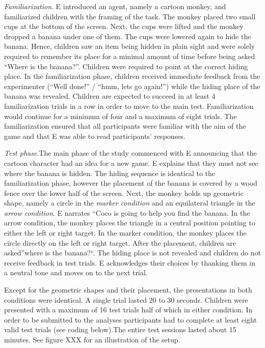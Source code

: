 \documentclass[
  man]{apa6}
\begin{document}
\emph{Familiarization}. E introduced an agent, namely a cartoon monkey, and familiarized children with the framing of the task. The monkey placed two small cups at the bottom of the screen. Next, the cups were lifted and the monkey dropped a banana under one of them. The cups were lowered again to hide the banana. Hence, children saw an item being hidden in plain sight and were solely required to remember its place for a minimal amount of time before being asked ``Where is the banana?''. Children were required to point at the correct hiding place. In the familiarization phase, children received immediate feedback from the experimenter (``Well done!'' / ``hmm, lets go again!'') while the hiding place of the banana was revealed. Children are expected to succeed in at least 4 familiarization trials in a row in order to move to the main test. Familiarization would continue for a minimum of four and a maximum of eight trials. The familiarization ensured that all participants were familiar with the aim of the game and that E was able to read participants' responses.

\emph{Test phase}.The main phase of the study commenced with E announcing that the cartoon character had an idea for a new game. E explains that they must not see where the banana is hidden. The hiding sequence is identical to the familiarization phase, however the placement of the banana is covered by a wood fence over the lower half of the screen. Next, the monkey holds up geometric shape, namely a circle in the \emph{marker condition} and an equilateral triangle in the \emph{arrow condition}. E narrates ``Coco is going to help you find the banana. In the arrow condition, the monkey places the triangle in a central position pointing to either the left or right target. In the marker condition, the monkey places the circle directly on the left or right target. After the placement, children are asked''where is the banana?{}``. The hiding place is not revealed and children do not receive feedback in test trials. E acknowledges their choices by thanking them in a neutral tone and moves on to the next trial.

Except for the geometric shapes and their placement, the presentations in both conditions were identical. A single trial lasted 20 to 30 seconds. Children were presented with a maximum of 16 test trials half of which in either condition. In order to be submitted to the analyses participants had to complete at least eight valid test trials (see coding below).The entire test sessions lasted about 15 minutes. See figure XXX for an illustration of the setup.
\end{document}
